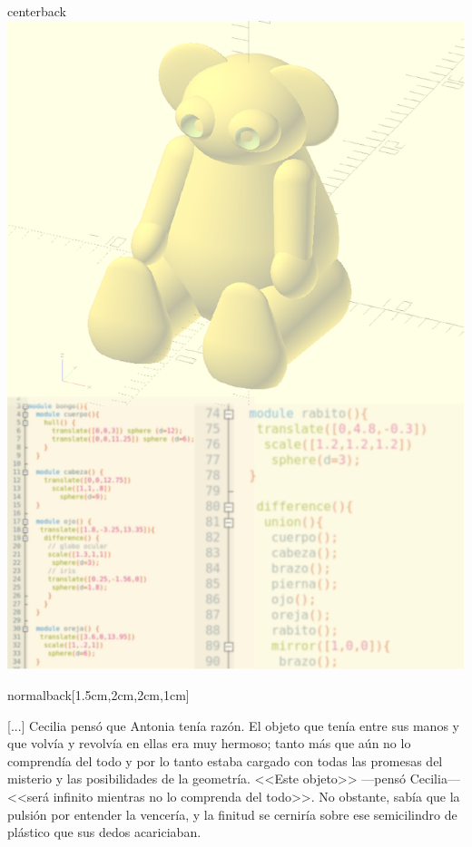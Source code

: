 \documentclass[coverwidth=148mm, coverheight=210mm, spinewidth=37mm,
flapwidth=7cm, wrapwidth=3mm, 11pt]{bookcover}
\begin{document}
\begin{bookcover}
  \begin{bookcoverelement}{center}{back}
    \includegraphics{contratapa-A5.pdf}
  \end{bookcoverelement}


  \begin{bookcoverelement}{normal}{back}[1.5cm,2cm,2cm,1cm]
    {\large

      \hspace{.5em} [...] Cecilia pensó que Antonia tenía razón. El objeto
      que tenía entre sus manos y que volvía y revolvía en ellas era muy
      hermoso; tanto más que aún no lo comprendía del todo y por lo
      tanto estaba cargado con todas las promesas del misterio y las
      posibilidades de la geometría. <<Este objeto>> ---pensó
      Cecilia--- <<será infinito mientras no lo comprenda del
      todo>>. No obstante, sabía que la pulsión por entender la
      vencería, y la finitud se cerniría sobre ese semicilindro de
      plástico que sus dedos acariciaban.

}
\end{bookcoverelement}
\end{bookcover}
\end{document}
